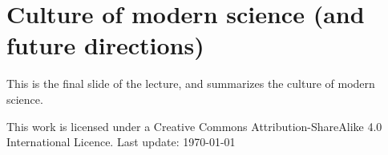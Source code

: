 \documentclass[12pt]{article}
\begin{document}
\section{Culture of modern science (and future directions)}

This is the final slide of the lecture, and summarizes the culture of
modern science.

\vspace{12pt}

\tiny
This work is licensed under a Creative Commons Attribution-ShareAlike
4.0 International Licence. Last update: \today
\end{document}
